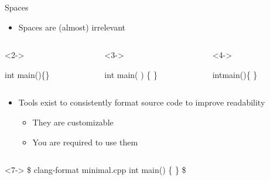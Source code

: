 \begin{frame}[fragile]{Spaces}

  \begin{itemize}
  \item Spaces are (almost) irrelevant
  \end{itemize}

  \begin{columns}[T]
  \begin{column}{.3\textwidth}<2->
    \begin{codeblock}
int main()\{\}

\end{codeblock}
  \end{column}

  \begin{column}{.3\textwidth}<3->
    \begin{codeblock}
int
main(  ) \{
   \}\end{codeblock}
  \end{column}

  \begin{column}{.3\textwidth}<4->
    \begin{codeblock}
intmain()\{ \}

    \end{codeblock}
  \end{column}


\end{columns}

\begin{itemize}[<6->]
\item Tools exist to consistently format source code to improve readability
  \begin{itemize}
  \item They are customizable
  \item You are required to use them
  \end{itemize}
\end{itemize}

\begin{columns}[T]
  \begin{column}{.4\textwidth}
    \begin{shellblock}<7->{
\$ clang-format minimal.cpp
int main()
\{
\}
\$}\end{shellblock}
  \end{column}


\end{columns}
\end{frame}
